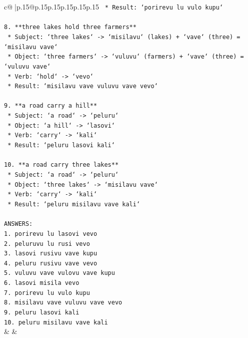 \documentclass{article}
\begin{document}
{\begin{supertabular}{c@{$\;$}|p{.15\linewidth}@{}p{.15\linewidth}p{.15\linewidth}p{.15\linewidth}p{.15\linewidth}p{.15\linewidth}}
{{{\texttt{    *   Result: `porirevu lu vulo kupu`} \\
\\ 
\texttt{8.  **three lakes hold three farmers**} \\
\texttt{    *   Subject: `three lakes` {-}> `misilavu` (lakes) + `vave` (three) = `misilavu vave`} \\
\texttt{    *   Object: `three farmers` {-}> `vuluvu` (farmers) + `vave` (three) = `vuluvu vave`} \\
\texttt{    *   Verb: `hold` {-}> `vevo`} \\
\texttt{    *   Result: `misilavu vave vuluvu vave vevo`} \\
\\ 
\texttt{9.  **a road carry a hill**} \\
\texttt{    *   Subject: `a road` {-}> `peluru`} \\
\texttt{    *   Object: `a hill` {-}> `lasovi`} \\
\texttt{    *   Verb: `carry` {-}> `kali`} \\
\texttt{    *   Result: `peluru lasovi kali`} \\
\\ 
\texttt{10. **a road carry three lakes**} \\
\texttt{    *   Subject: `a road` {-}> `peluru`} \\
\texttt{    *   Object: `three lakes` {-}> `misilavu vave`} \\
\texttt{    *   Verb: `carry` {-}> `kali`} \\
\texttt{    *   Result: `peluru misilavu vave kali`} \\
\\ 
\texttt{ANSWERS:} \\
\texttt{1. porirevu lu lasovi vevo} \\
\texttt{2. peluruvu lu rusi vevo} \\
\texttt{3. lasovi rusivu vave kupu} \\
\texttt{4. peluru rusivu vave vevo} \\
\texttt{5. vuluvu vave vulovu vave kupu} \\
\texttt{6. lasovi misila vevo} \\
\texttt{7. porirevu lu vulo kupu} \\
\texttt{8. misilavu vave vuluvu vave vevo} \\
\texttt{9. peluru lasovi kali} \\
\texttt{10. peluru misilavu vave kali} \\
            }
        }
    }
    & & \\ \\


\end{supertabular}}
\end{document}
